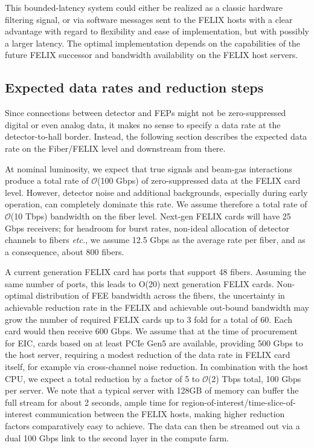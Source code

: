 This bounded-latency system could either be realized as a classic hardware filtering signal, or via software messages sent to the FELIX hosts with a clear advantage with regard to flexibility and ease of implementation, but with possibly a larger latency. The optimal implementation depends on the capabilities of the future FELIX successor and bandwidth availability on the FELIX host servers.



\subsection{Expected data rates and reduction steps}



Since connections between detector and FEPs might not be zero-suppressed digital or even analog data, it makes no sense to specify a data rate at the detector-to-hall border. Instead, the following section describes the expected data rate on the Fiber/FELIX level and downstream from there.

At nominal luminosity, we expect that true signals and beam-gas interactions produce a total rate of $\mathcal{O}$(100 Gbps) of zero-suppressed data at the FELIX card level. However, detector noise and additional backgrounds, especially during early operation, can completely dominate this rate. We assume therefore a total rate of $\mathcal{O}$(10 Tbps) bandwidth on the fiber level. Next-gen FELIX cards will have 25 Gbps receivers; for headroom for burst rates, non-ideal allocation of detector channels to fibers \emph{etc.}, we assume 12.5 Gbps as the average rate per fiber, and as a consequence, about 800 fibers.

A current generation FELIX card has ports that support 48 fibers. Assuming the same number of ports, this leads to O(20) next generation FELIX cards. Non-optimal distribution of FEE bandwidth across the fibers, the uncertainty in achievable reduction rate in the FELIX and achievable out-bound bandwidth may grow the number of required FELIX cards up to 3 fold for a total of 60. Each card would then receive 600 Gbps. We assume that at the time of procurement for EIC, cards based on at least PCIe Gen5 are available, providing 500 Gbps to the host server, requiring a modest reduction of the data rate in FELIX card itself, for example via cross-channel noise reduction. In combination with the host CPU, we expect a total reduction by a factor of 5 to $\mathcal{O}$(2) Tbps total, 100 Gbps per server. We note that a typical server with 128GB of memory can buffer the full stream for about 2 seconds, ample time for region-of-interest/time-slice-of-interest communication between the FELIX hosts, making higher reduction factors comparatively easy to achieve. The data can then be streamed out via a dual 100 Gbps link to the second layer in the compute farm.

